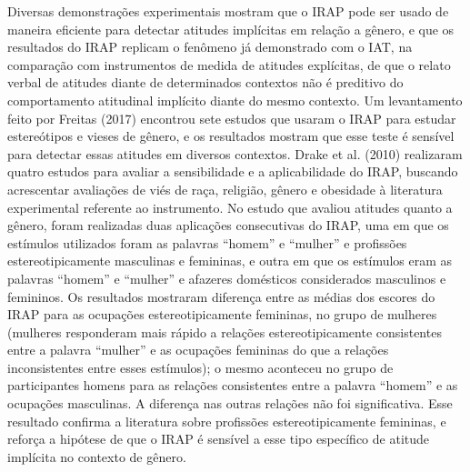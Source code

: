Diversas demonstrações experimentais mostram que o IRAP pode ser usado de maneira eficiente para detectar atitudes implícitas em relação a gênero, e que os resultados do IRAP replicam o fenômeno já demonstrado com o IAT, na comparação com instrumentos de medida de atitudes explícitas, de que o relato verbal de atitudes diante de determinados contextos não é preditivo do comportamento atitudinal implícito diante do mesmo contexto. Um levantamento feito por Freitas (2017) encontrou sete estudos que usaram o IRAP para estudar estereótipos e vieses de gênero, e os resultados mostram que esse teste é sensível para detectar essas atitudes em diversos contextos. Drake et al. (2010) realizaram quatro estudos para avaliar a sensibilidade e a aplicabilidade do IRAP, buscando acrescentar avaliações de viés de raça, religião, gênero e obesidade à literatura experimental referente ao instrumento. No estudo que avaliou atitudes quanto a gênero, foram realizadas duas aplicações consecutivas do IRAP, uma em que os estímulos utilizados foram as palavras ``homem'' e ``mulher'' e profissões estereotipicamente masculinas e femininas, e outra em que os estímulos eram as palavras ``homem'' e ``mulher'' e afazeres domésticos considerados masculinos e femininos. Os resultados mostraram diferença entre as médias dos escores do IRAP para as ocupações estereotipicamente femininas, no grupo de mulheres (mulheres responderam mais rápido a relações estereotipicamente consistentes entre a palavra ``mulher'' e as ocupações femininas do que a relações inconsistentes entre esses estímulos); o mesmo aconteceu no grupo de participantes homens para as relações consistentes entre a palavra ``homem'' e as ocupações masculinas. A diferença nas outras relações não foi significativa. Esse resultado confirma a literatura sobre profissões estereotipicamente femininas, e reforça a hipótese de que o IRAP é sensível a esse tipo específico de atitude implícita no contexto de gênero.

